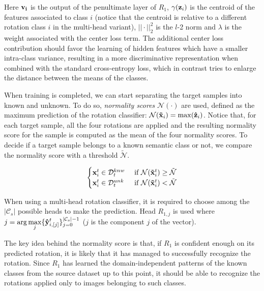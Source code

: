 \documentclass[10pt,twocolumn,letterpaper]{article}
\begin{document}
Here ${\bf v_i}$ is the output of the penultimate layer of $R_1$,
$\gamma({\bf z}_i)$ is the centroid of the features associated to class $i$
(notice that the centroid is relative to a different rotation class $i$ in the multi-head variant),
$||\cdot||_2^2$ is the $l$-2 norm and $\lambda$ is the weight associated with the center loss term.
The additional center loss contribution should favor the learning of hidden features which have
a smaller intra-class variance, resulting in a more discriminative representation
when combined with the standard cross-entropy loss,
which in contrast tries to enlarge the distance between the means of the classes.

When training is completed, 
we can start separating the target samples into known and unknown.
To do so,
{\it normality scores} $\mathcal{N}(\cdot)$ are used,
defined as the maximum prediction of the rotation classifier:
$\mathcal{N}({\bf\tilde{x}}_i) = \max({\bf\hat{z}}_i)$.
Notice that, for each target sample, all the four rotations are applied and the resulting normality score for the sample
is computed as the mean of the four normality scores.
To decide if a target sample belongs to a known semantic class or not, we compare the normality score with a threshold $\tilde{\mathcal{N}}$.

\begin{equation}
  \begin{cases}
    {\bf x}_i^t \in \mathcal{D}_t^{knw} & \text{ if } \mathcal{N}({\bf\tilde x}_i^t) \geq \tilde{\mathcal{N}} \\
    {\bf x}_i^t \in \mathcal{D}_t^{unk} & \text{ if } \mathcal{N}({\bf\tilde x}_i^t) < \tilde{\mathcal{N}}
  \end{cases}
  \label{eq:sample_separation}
\end{equation}

When using a multi-head rotation classifier, 
it is required to choose among the $|\mathcal{C}_s|$ possible heads to make the prediction.
Head $R_{1,j}$ is used where $\displaystyle j = \arg\max_j \{{\bf\hat{y}}_{i, [j]}^t\}_{j=0}^{|\mathcal{C}_s|-1}$
($j$ is the component $j$ of the vector).

The key idea behind the normality score is that, if $R_1$ is confident enough on its predicted rotation,
it is likely that it has managed to successfully recognize the rotation.
Since $R_1$ has learned the domain-independent patterns of the known classes from the source dataset up to this point,
it should be able to recognize the rotations applied only to images belonging to such classes.
\end{document}
